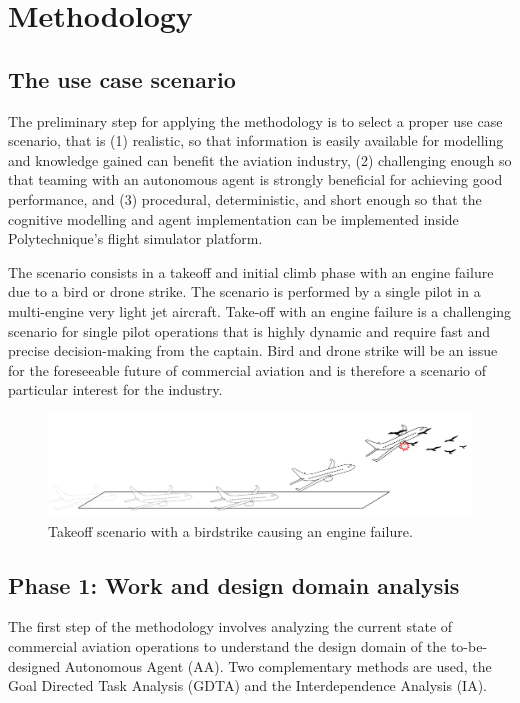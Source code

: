 \documentclass[12pt,a4paper]{article} %
\begin{document}
	\section{Methodology} %
	\subsection{The use case scenario}
	The preliminary step for applying the methodology is to select a proper use case scenario, that is (1) realistic, so that information is easily available for modelling and knowledge gained can benefit the aviation industry, (2) challenging enough so that teaming with an autonomous agent is strongly beneficial for achieving good performance, and (3) procedural, deterministic, and short enough so that the cognitive modelling and agent implementation can be implemented inside Polytechnique's flight simulator platform.
	
	The scenario consists in a takeoff and initial climb phase with an engine failure due to a bird or drone strike. The scenario is performed by a single pilot in a multi-engine very light jet aircraft. Take-off with an engine failure is a challenging scenario for single pilot operations that is highly dynamic and require fast and precise decision-making from the captain. Bird and drone strike will be an issue for the foreseeable future of commercial aviation and is therefore a scenario of particular interest for the industry.

	\begin{figure}[h!]
 		\centering
  		\includegraphics[width=1\textwidth]{./images/scenario.png}
   		\caption{Takeoff scenario with a birdstrike causing an engine failure.}
		\label{fig:your-image-label}
	\end{figure}


	\subsection{Phase 1: Work and design domain analysis}
	The first step of the methodology involves analyzing the current state of commercial aviation operations to understand the design domain of the to-be-designed Autonomous Agent (AA). Two complementary methods are used, the Goal Directed Task Analysis (GDTA) and the Interdependence Analysis (IA).
\end{document}
